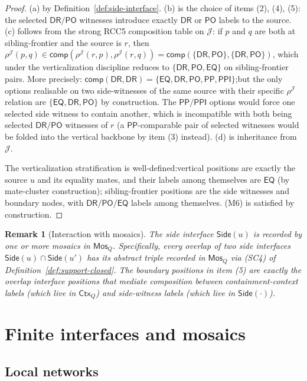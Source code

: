 \documentclass[11pt]{article}
\newtheorem{remark}[theorem]{Remark}
\newcommand{\EQ}{\mathsf{EQ}}
\newcommand{\DR}{\mathsf{DR}}
\newcommand{\PO}{\mathsf{PO}}
\newcommand{\PP}{\mathsf{PP}}
\newcommand{\PPI}{\mathsf{PPI}}
\newcommand{\comp}{\mathsf{comp}}
\newcommand{\J}{\mathcal J}
\newcommand{\Mos}{\mathsf{Mos}}
\newcommand{\Ctx}{\mathsf{Ctx}}
\newcommand{\Side}{\mathsf{Side}}
\begin{document}
\begin{proof}
(a) by Definition~\ref{def:side-interface}.  (b) is the choice of
items (2), (4), (5): the selected $\DR/\PO$ witnesses introduce
exactly $\DR$ or $\PO$ labels to the source.  (c) follows from the
strong RCC5 composition table on $\J$: if $p$ and $q$ are both at
sibling-frontier and the source is $r$, then $\rho^\J(p,q)\in
\comp(\rho^\J(r,p),\rho^\J(r,q))=\comp(\{\DR,\PO\},\{\DR,\PO\})$,
which under the verticalization discipline reduces to
$\{\DR,\PO,\EQ\}$ on sibling-frontier pairs.  More precisely:
$\comp(\DR,\DR)=\{\EQ,\DR,\PO,\PP,\PPI\}$;\@ but the only options
realisable on two side-witnesses of the same source with their
specific $\rho^\J$ relation are $\{\EQ,\DR,\PO\}$ by construction.
The $\PP/\PPI$ options would force one selected side witness to
contain another, which is incompatible with both being selected
$\DR/\PO$ witnesses of $r$ (a $\PP$-comparable pair of selected
witnesses would be folded into the vertical backbone by item (3)
instead).  (d) is inheritance from $\J$.

The verticalization stratification is well-defined:\@ vertical
positions are exactly the source $u$ and its equality mates, and
their labels among themselves are $\EQ$ (by mate-cluster
construction); sibling-frontier positions are the side witnesses
and boundary nodes, with $\DR/\PO/\EQ$ labels among themselves.
(M6) is satisfied by construction.
\end{proof}

\begin{remark}[Interaction with mosaics]
The side interface $\Side(u)$ is recorded by one or more mosaics
in $\Mos_Q$.  Specifically, every overlap of two side interfaces
$\Side(u)\cap\Side(u')$ has its abstract triple recorded in
$\Mos_Q$ via (SC4) of Definition~\ref{def:support-closed}.  The
boundary positions in item (5) are exactly the overlap interface
positions that mediate composition between containment-context
labels (which live in $\Ctx_Q$) and side-witness labels (which live
in $\Side(\cdot)$).
\end{remark}

\section{Finite interfaces and mosaics}

\subsection{Local networks}
\end{document}
